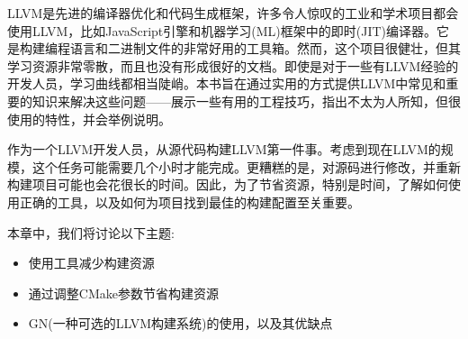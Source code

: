 
LLVM是先进的编译器优化和代码生成框架，许多令人惊叹的工业和学术项目都会使用LLVM，比如JavaScript引擎和机器学习(ML)框架中的即时(JIT)编译器。它是构建编程语言和二进制文件的非常好用的工具箱。然而，这个项目很健壮，但其学习资源非常零散，而且也没有形成很好的文档。即使是对于一些有LLVM经验的开发人员，学习曲线都相当陡峭。本书旨在通过实用的方式提供LLVM中常见和重要的知识来解决这些问题——展示一些有用的工程技巧，指出不太为人所知，但很使用的特性，并会举例说明。

作为一个LLVM开发人员，从源代码构建LLVM第一件事。考虑到现在LLVM的规模，这个任务可能需要几个小时才能完成。更糟糕的是，对源码进行修改，并重新构建项目可能也会花很长的时间。因此，为了节省资源，特别是时间，了解如何使用正确的工具，以及如何为项目找到最佳的构建配置至关重要。

本章中，我们将讨论以下主题:

\begin{itemize}
	\item 使用工具减少构建资源
	\item 通过调整CMake参数节省构建资源
	\item GN(一种可选的LLVM构建系统)的使用，以及其优缺点
\end{itemize}













